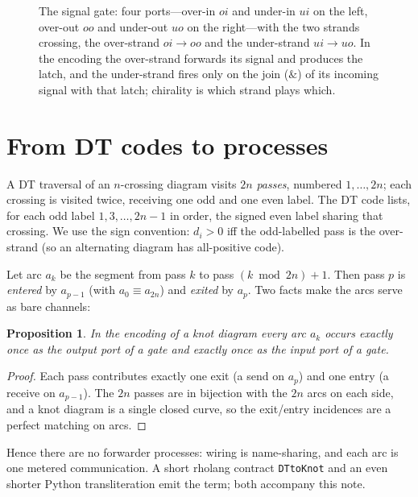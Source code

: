 \documentclass[11pt]{article}
\newtheorem{proposition}{Proposition}
\theoremstyle{definition}
\begin{document}
\begin{figure}[htb]
\centering
{}
\caption{The signal gate: four ports---over-in $oi$ and under-in $ui$ on the left,
over-out $oo$ and under-out $uo$ on the right---with the two strands crossing, the
over-strand $oi\!\to\!oo$ and the under-strand $ui\!\to\!uo$. In the encoding the
over-strand forwards its signal and produces the latch, and the under-strand fires
only on the join ($\&$) of its incoming signal with that latch; chirality is which
strand plays which.}
\label{fig:gate}
\end{figure}

\section{From DT codes to processes}

A DT traversal of an $n$-crossing diagram visits $2n$ \emph{passes}, numbered
$1,\dots,2n$; each crossing is visited twice, receiving one odd and one even
label. The DT code lists, for each odd label $1,3,\dots,2n-1$ in order, the signed
even label sharing that crossing. We use the sign convention: $d_i>0$ iff the
odd-labelled pass is the over-strand (so an alternating diagram has all-positive
code).

Let arc $a_k$ be the segment from pass $k$ to pass $(k \bmod 2n)+1$. Then pass $p$
is \emph{entered} by $a_{p-1}$ (with $a_0 \equiv a_{2n}$) and \emph{exited} by
$a_p$. Two facts make the arcs serve as bare channels:
\begin{proposition}\label{prop:bipartite}
In the encoding of a knot diagram every arc $a_k$ occurs exactly once as the
output port of a gate and exactly once as the input port of a gate.
\end{proposition}
\begin{proof}
Each pass contributes exactly one exit (a send on $a_p$) and one entry (a receive
on $a_{p-1}$). The $2n$ passes are in bijection with the $2n$ arcs on each side,
and a knot diagram is a single closed curve, so the exit/entry incidences are a
perfect matching on arcs.
\end{proof}
Hence there are no forwarder processes: wiring is name-sharing, and each arc is
one metered communication. A short rholang contract \texttt{DTtoKnot} and an even
shorter Python transliteration emit the term; both accompany this note.
\end{document}
